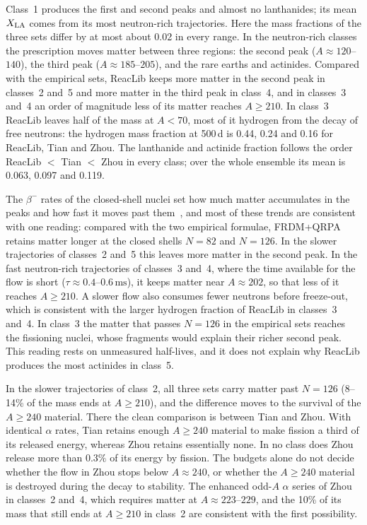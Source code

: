 Class~1 produces the first and second peaks and almost no lanthanides; its mean $X_{\rm LA}$ comes from its most neutron-rich trajectories.
Here the mass fractions of the three sets differ by at most about 0.02 in every range.
In the neutron-rich classes the prescription moves matter between three regions: the second peak ($A\approx120$--$140$), the third peak ($A\approx185$--$205$), and the rare earths and actinides.
Compared with the empirical sets, ReacLib keeps more matter in the second peak in classes~2 and~5 and more matter in the third peak in class~4, and in classes~3 and~4 an order of magnitude less of its matter reaches $A\geq210$.
In class~3 ReacLib leaves half of the mass at $A<70$, most of it hydrogen from the decay of free neutrons: the hydrogen mass fraction at 500\,d is 0.44, 0.24 and 0.16 for ReacLib, Tian and Zhou.
The lanthanide and actinide fraction follows the order ReacLib $<$ Tian $<$ Zhou in every class; over the whole ensemble its mean is 0.063, 0.097 and 0.119.

The $\beta^-$ rates of the closed-shell nuclei set how much matter accumulates in the peaks and how fast it moves past them~\cite{mumpower_impact_2016}, and most of these trends are consistent with one reading: compared with the two empirical formulae, FRDM+QRPA retains matter longer at the closed shells $N=82$ and $N=126$.
In the slower trajectories of classes~2 and~5 this leaves more matter in the second peak.
In the fast neutron-rich trajectories of classes~3 and~4, where the time available for the flow is short ($\tau\approx0.4$--$0.6\,\mathrm{ms}$), it keeps matter near $A\approx202$, so that less of it reaches $A\geq210$.
A slower flow also consumes fewer neutrons before freeze-out, which is consistent with the larger hydrogen fraction of ReacLib in classes~3 and~4.
In class~3 the matter that passes $N=126$ in the empirical sets reaches the fissioning nuclei, whose fragments would explain their richer second peak.
This reading rests on unmeasured half-lives, and it does not explain why ReacLib produces the most actinides in class~5.

In the slower trajectories of class~2, all three sets carry matter past $N=126$ (8--14\% of the mass ends at $A\geq210$), and the difference moves to the survival of the $A\geq240$ material.
There the clean comparison is between Tian and Zhou.
With identical $\alpha$ rates, Tian retains enough $A\geq240$ material to make fission a third of its released energy, whereas Zhou retains essentially none.
In no class does Zhou release more than $0.3\%$ of its energy by fission.
The budgets alone do not decide whether the flow in Zhou stops below $A\approx240$, or whether the $A\geq240$ material is destroyed during the decay to stability.
The enhanced odd-$A$ $\alpha$ series of Zhou in classes~2 and~4, which requires matter at $A\approx223$--$229$, and the 10\% of its mass that still ends at $A\geq210$ in class~2 are consistent with the first possibility.

